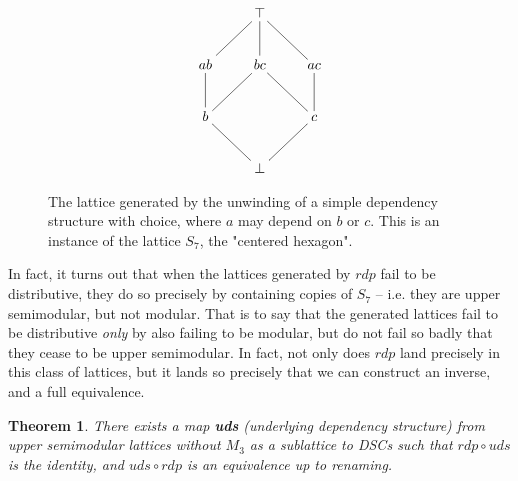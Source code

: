 \documentclass[hoptionsi,review,format=acmsmall]{acmart}
\newtheorem{theorem}{Theorem}[section]
\theoremstyle{definition}
\begin{document}
\begin{figure}
\begin{minipage}[c]{0.3\textwidth}
\begin{equation*}
    \xymatrix{& \top \ar@{-}[dl] \ar@{-}[d] \ar@{-}[dr] & \\
      ab \ar@{-}[d]& bc \ar@{-}[dl] \ar@{-}[dr] &
        ac \ar@{-}[d]  \\
        b \ar@{-}[dr]  & & c \ar@{-}[dl] \\
        & \bot &
        } 
\end{equation*}
\end{minipage}
\caption{The lattice generated by the unwinding of a simple dependency structure with choice, where \(a\) may depend on \(b\) or \(c\). This is an instance of the lattice \(S_7\), the "centered hexagon".}
\label{Fig3}
\end{figure}

In fact, it turns out that when the lattices generated by \(rdp\) fail to be distributive, they do so precisely by containing copies of \(S_7\) -- i.e. they are upper semimodular, but not modular. That is to say that the generated lattices fail to be distributive \textit{only} by also failing to be modular, but do not fail so badly that they cease to be upper semimodular. In fact, not only does \(rdp\) land precisely in this class of lattices, but it lands so precisely that we can construct an inverse, and a full equivalence.

\begin{theorem}
\label{representation}
There exists a map \textbf{uds} (underlying dependency structure) from upper semimodular lattices without \(M_3\) as a sublattice to DSCs such that  \(rdp \circ uds\) is the identity, and \(uds \circ rdp\) is an equivalence up to renaming.
\end{theorem}
\end{document}
